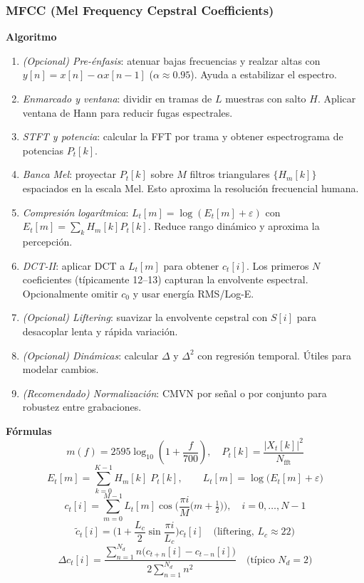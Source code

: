 \subsubsection{MFCC (Mel Frequency Cepstral Coefficients)}
\textbf{Algoritmo} \parencite{davis1980tassp, muller2015fmp, slaney1998auditory, logan2000mfcc}
\begin{enumerate}
  \item \emph{(Opcional) Pre-énfasis}: atenuar bajas frecuencias y realzar altas con \(y[n]=x[n]-\alpha x[n-1]\) (\(\alpha\approx0.95\)). Ayuda a estabilizar el espectro.
  \item \emph{Enmarcado y ventana}: dividir en tramas de \(L\) muestras con salto \(H\). Aplicar ventana de Hann para reducir fugas espectrales.
  \item \emph{STFT y potencia}: calcular la FFT por trama y obtener espectrograma de potencias \(P_t[k]\).
  \item \emph{Banca Mel}: proyectar \(P_t[k]\) sobre \(M\) filtros triangulares \(\{H_m[k]\}\) espaciados en la escala Mel. Esto aproxima la resolución frecuencial humana.
  \item \emph{Compresión logarítmica}: \(L_t[m]=\log(E_t[m]+\varepsilon)\) con \(E_t[m]=\sum_k H_m[k]P_t[k]\). Reduce rango dinámico y aproxima la percepción.
  \item \emph{DCT-II}: aplicar DCT a \(L_t[m]\) para obtener \(c_t[i]\). Los primeros \(N\) coeficientes (típicamente 12–13) capturan la envolvente espectral. Opcionalmente omitir \(c_0\) y usar energía RMS/Log-E.
  \item \emph{(Opcional) Liftering}: suavizar la envolvente cepstral con \(S[i]\) para desacoplar lenta y rápida variación.
  \item \emph{(Opcional) Dinámicas}: calcular \(\Delta\) y \(\Delta^2\) con regresión temporal. Útiles para modelar cambios.
  \item \emph{(Recomendado) Normalización}: CMVN por señal o por conjunto para robustez entre grabaciones.
\end{enumerate}

\textbf{Fórmulas} \parencite{davis1980tassp, muller2015fmp}
\[
  m(f)=2595\log_{10}\!\left(1+\frac{f}{700}\right),\quad
  P_t[k]=\frac{|X_t[k]|^2}{N_{\mathrm{fft}}}
\]
\[
  E_t[m]=\sum_{k=0}^{K-1} H_m[k]\;P_t[k],\qquad
  L_t[m]=\log\!\big(E_t[m]+\varepsilon\big)
\]
\[
  c_t[i]=\sum_{m=0}^{M-1} L_t[m]\cos\!\Big(\frac{\pi i}{M}\big(m+\tfrac12\big)\Big),\quad i=0,\dots,N-1
\]
\[
  \tilde c_t[i]=\Big(1+\frac{L_c}{2}\sin\frac{\pi i}{L_c}\Big)c_t[i]\quad\text{(liftering, \(L_c\approx22\))}
\]
\[
  \Delta c_t[i]=\frac{\sum_{n=1}^{N_d}n\big(c_{t+n}[i]-c_{t-n}[i]\big)}{2\sum_{n=1}^{N_d}n^2}\quad\text{(típico \(N_d=2\))}
\]

